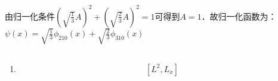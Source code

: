 
\begin{issues}
\issueDraft
\issueTODO
\end{issues}

\subsection{ }
由归一化条件$\displaystyle (\sqrt{\frac{1}{3}}A)^{2} + (\sqrt{\frac{2}{3}}A)^{2} = 1 $可得到$A=1$．故归一化函数为：\\

$\displaystyle \psi(x) = \sqrt{\frac{1}{3}}\phi_{210}(x)+\sqrt{\frac{2}{3}} \phi_{310}(x)$ \\

\subsection{ }
\begin{enumerate}
\item 
\begin{equation}
\begin{aligned}
[L^{2},L_{x}]
\end{aligned}
\end{equation}

\end{enumerate}
